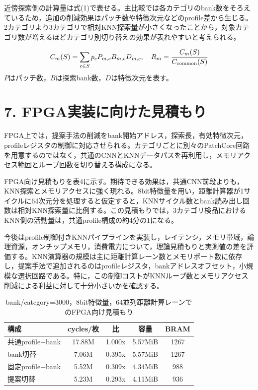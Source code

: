 \documentclass[a4paper,twocolumn,10pt]{ltjsarticle}
\begin{document}
近傍探索側の計算量は式(1)で表せる。主比較では各カテゴリのbank数をそろえているため，追加の削減効果はパッチ数や特徴次元などのprofile差から生じる。2カテゴリより3カテゴリで相対KNN探索量が小さくなったことから，対象カテゴリ数が増えるほどカテゴリ別切り替えの効果が表れやすいと考えられる。

\begin{equation}
C_m(S)=\sum_{c\in S}p_c P_{m,c}B_{m,c}D_{m,c},\quad R_m=\frac{C_m(S)}{C_{\rm common}(S)}
\end{equation}
\noindent $P$はパッチ数，$B$は探索bank数，$D$は特徴次元を表す。
\section*{7. FPGA実装に向けた見積もり}
FPGA上では，提案手法の削減をbank開始アドレス，探索長，有効特徴次元，profileレジスタの制御に対応させられる。カテゴリごとに別々のPatchCore回路を用意するのではなく，共通のCNNとKNNデータパスを再利用し，メモリアクセス範囲とループ回数を切り替える構成になる。

FPGA向け見積もりを表4に示す。期待できる効果は，共通CNN前段よりも，KNN探索とメモリアクセスに強く現れる。8bit特徴量を用い，距離計算器が1サイクルに64次元分を処理すると仮定すると，KNNサイクル数とbank読み出し回数は相対KNN探索量に比例する。この見積もりでは，3カテゴリ検品におけるKNN側の活動量は，共通profile構成の約4分の1になる。

今後はprofile制御付きKNNパイプラインを実装し，レイテンシ，メモリ帯域，論理資源，オンチップメモリ，消費電力について，理論見積もりと実測値の差を評価する。KNN演算器の規模は主に距離計算レーン数とメモリポート数に依存し，提案手法で追加されるのはprofileレジスタ，bankアドレスオフセット，小規模な選択回路である。特に，この制御コストがKNNループ数とメモリアクセス削減による利益に対して十分小さいかを確認する。

\begin{table}[h]\centering\small
\caption{bank/category=3000，8bit特徴量，64並列距離計算レーンでのFPGA向け見積もり}
\begin{tabular}{lcccc}\toprule 構成 & cycles/枚 & 比 & 容量 & BRAM\\\midrule
共通profile+bank & 17.88M & 1.000x & 5.57MiB & 1267\\
bank切替 & 7.06M & 0.395x & 5.57MiB & 1267\\
固定profile+bank & 5.52M & 0.309x & 4.34MiB & 988\\
提案切替 & 5.23M & 0.293x & 4.11MiB & 936\\
\bottomrule\end{tabular}\end{table}
\end{document}
